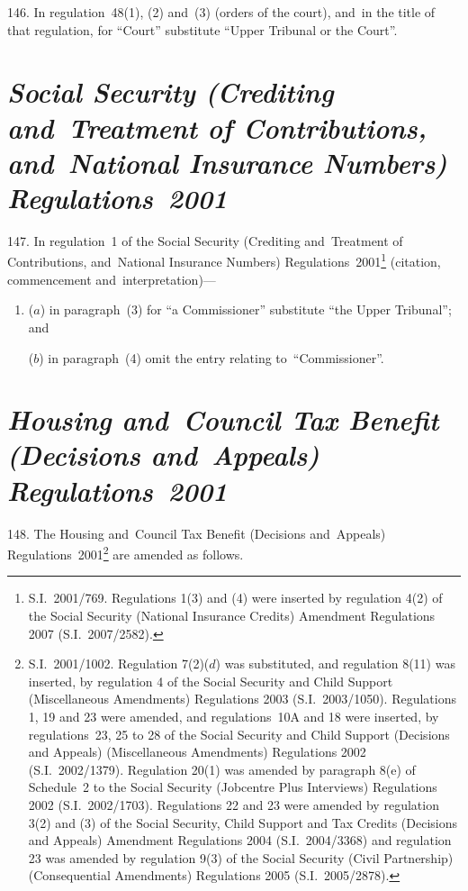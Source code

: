 \documentclass[12pt,a4paper]{article}
\begin{document}
\medskip

146.  In regulation~48(1), (2) and~(3) (orders of the court), and~in the title of that regulation, for “Court” substitute “Upper Tribunal or the Court”.

\section*{\itshape Social Security (Crediting and~Treatment of Contributions, and~National Insurance Numbers) Regulations~2001}

\enlargethispage{-3\baselineskip}

147.  In regulation~1 of the Social Security (Crediting and~Treatment of Contributions, and~National Insurance Numbers) Regulations~2001\footnote{S.I.~2001/769. Regulations 1(3) and (4) were inserted by regulation 4(2) of the Social Security (National Insurance Credits) Amendment Regulations 2007 (S.I.~2007/2582).} (citation, commencement and~interpretation)—
\begin{enumerate}\item[]
($a$) in paragraph~(3) for “a Commissioner” substitute “the Upper Tribunal”; and

($b$) in paragraph~(4) omit the entry relating to~“Commissioner”.
\end{enumerate}

\section*{\itshape Housing and~Council Tax Benefit (Decisions and~Appeals) Regulations~2001}

148.  The Housing and~Council Tax Benefit (Decisions and~Appeals) Regulations~2001\footnote{S.I.~2001/1002. Regulation 7(2)($d$) was substituted, and regulation 8(11) was inserted, by regulation 4 of the Social Security and Child Support (Miscellaneous Amendments) Regulations 2003 (S.I.~2003/1050). Regulations 1, 19 and 23 were amended, and regulations~10A and 18 were inserted, by regulations~23, 25 to 28 of the Social Security and Child Support (Decisions and Appeals) (Miscellaneous Amendments) Regulations 2002 (S.I.~2002/1379). Regulation 20(1) was amended by paragraph 8(e) of Schedule~2 to the Social Security (Jobcentre Plus Interviews) Regulations 2002 (S.I.~2002/1703). Regulations 22 and 23 were amended by regulation 3(2) and (3) of the Social Security, Child Support and Tax Credits (Decisions and Appeals) Amendment Regulations 2004 (S.I.~2004/3368) and regulation 23 was amended by regulation 9(3) of the Social Security (Civil Partnership) (Consequential Amendments) Regulations 2005 (S.I.~2005/2878).} are amended as follows.
\end{document}
